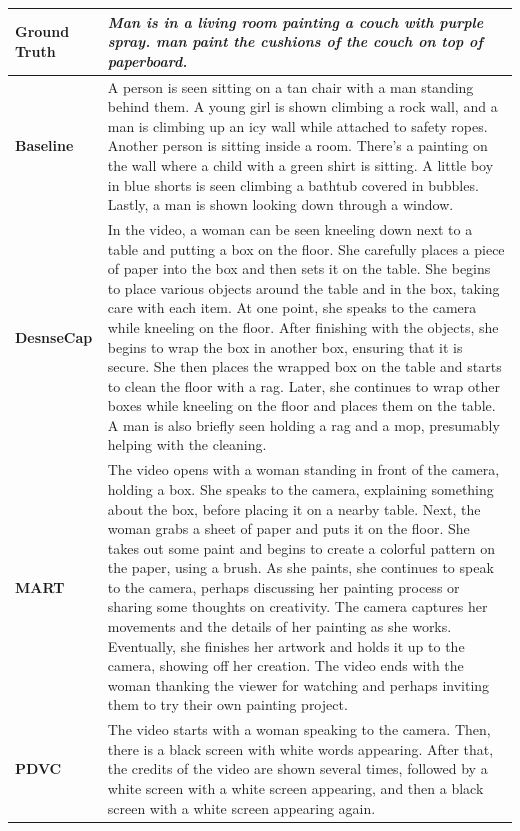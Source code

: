 \begin{table}[!htbp]
    \centering
    \renewcommand{\arraystretch}{1.5}
        \begin{tabular}{|p{2cm}p{14cm}|} 
             \hline
             \textbf{Ground Truth} & \textit{Man is in a living room painting a couch with purple spray.
man paint the cushions of the couch on top of paperboard.}\\
             \hline
             \textbf{Baseline}  & A person is seen sitting on a tan chair with a man standing behind them. A young girl is shown climbing a rock wall, and a man is climbing up an icy wall while attached to safety ropes. Another person is sitting inside a room. There's a painting on the wall where a child with a green shirt is sitting. A little boy in blue shorts is seen climbing a bathtub covered in bubbles. Lastly, a man is shown looking down through a window. \\
             \textbf{DesnseCap } & In the video, a woman can be seen kneeling down next to a table and putting a box on the floor. She carefully places a piece of paper into the box and then sets it on the table. She begins to place various objects around the table and in the box, taking care with each item. At one point, she speaks to the camera while kneeling on the floor. After finishing with the objects, she begins to wrap the box in another box, ensuring that it is secure. She then places the wrapped box on the table and starts to clean the floor with a rag. Later, she continues to wrap other boxes while kneeling on the floor and places them on the table. A man is also briefly seen holding a rag and a mop, presumably helping with the cleaning.\\
             \textbf{MART}  &  The video opens with a woman standing in front of the camera, holding a box. She speaks to the camera, explaining something about the box, before placing it on a nearby table. Next, the woman grabs a sheet of paper and puts it on the floor. She takes out some paint and begins to create a colorful pattern on the paper, using a brush. As she paints, she continues to speak to the camera, perhaps discussing her painting process or sharing some thoughts on creativity. The camera captures her movements and the details of her painting as she works. Eventually, she finishes her artwork and holds it up to the camera, showing off her creation. The video ends with the woman thanking the viewer for watching and perhaps inviting them to try their own painting project.\\
             \textbf{PDVC}  & The video starts with a woman speaking to the camera. Then, there is a black screen with white words appearing. After that, the credits of the video are shown several times, followed by a white screen with a white screen appearing, and then a black screen with a white screen appearing again.\\

\end{tabular}
\end{table}
